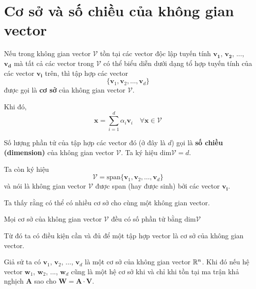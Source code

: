 \section{Cơ sở và số chiều của không gian vector}

Nếu trong không gian vector $\mathcal{V}$ tồn tại các vector độc lập tuyến tính $\bm{v_1}$, $\bm{v_2}$, ..., $\bm{v_d}$
mà tất cả các vector trong $\mathcal{V}$ có thể biểu diễn dưới dạng tổ hợp tuyến tính của các vector $\bm{v_i}$ trên,
thì tập hợp các vector 
\[\{ \bm{v}_1, \bm{v}_2, \ldots, \bm{v}_d \}\]
được gọi là \textbf{cơ sở} của không gian vector $\mathcal{V}$.

Khi đó,
\[\bm{x} = \sum_{i=1}^{d} \alpha_i \bm{v}_i \quad \forall \bm{x} \in \mathcal{V}\]

Số lượng phần tử của tập hợp các vector đó (ở đây là $d$) gọi là \textbf{số chiều (dimension)} của không gian vector $\mathcal{V}$.
Ta ký hiệu $\text{dim} \mathcal{V} = d$.

Ta còn ký hiệu 
\[\mathcal{V} = \text{span} \{\bm{v}_1, \bm{v}_2, \ldots, \bm{v}_d\}\]
và nói là không gian vector $\mathcal{V}$ được span (hay được sinh) bởi các vector $\bm{v_i}$.

Ta thấy rằng có thể có nhiều cơ sở cho cùng một không gian vector.

\begin{theorem}
    Mọi cơ sở của không gian vector $\mathcal{V}$ đều có số phần tử bằng $\text{dim} \mathcal{V}$
\end{theorem}

Từ đó ta có điều kiện cần và đủ để một tập hợp vector là cơ sở của không gian vector.

Giả sử ta có $\bm{v}_1$, $\bm{v}_2$, ..., $\bm{v}_d$ là một cơ sở của không gian vector $\mathbb{R}^n$.
Khi đó nếu hệ vector $\bm{w}_1$, $\bm{w}_2$, ..., $\bm{w}_d$ cũng là một hệ cơ sở khi và chỉ khi tồn 
tại ma trận khả nghịch $\bm{A}$ sao cho $\bm{W} = \bm{A} \cdot \bm{V}$.

